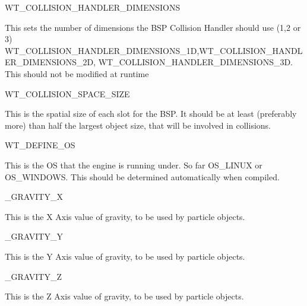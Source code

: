 \begin{DoxyItemize}
\item WT\_\-COLLISION\_\-HANDLER\_\-DIMENSIONS
\begin{DoxyItemize}
\item This sets the number of dimensions the BSP Collision Handler should use (1,2 or 3) WT\_\-COLLISION\_\-HANDLER\_\-DIMENSIONS\_\-1D,WT\_\-COLLISION\_\-HANDLER\_\-DIMENSIONS\_\-2D, WT\_\-COLLISION\_\-HANDLER\_\-DIMENSIONS\_\-3D. This should not be modified at runtime
\end{DoxyItemize}
\end{DoxyItemize}
\begin{DoxyItemize}
\item WT\_\-COLLISION\_\-SPACE\_\-SIZE
\begin{DoxyItemize}
\item This is the spatial size of each slot for the BSP. It should be at least (preferably more) than half the largest object size, that will be involved in collisions.
\end{DoxyItemize}
\end{DoxyItemize}
\begin{DoxyItemize}
\item WT\_\-DEFINE\_\-OS
\begin{DoxyItemize}
\item This is the OS that the engine is running under. So far OS\_\-LINUX or OS\_\-WINDOWS. This should be determined automatically when compiled.
\end{DoxyItemize}
\end{DoxyItemize}
\begin{DoxyItemize}
\item \_\-GRAVITY\_\-X
\begin{DoxyItemize}
\item This is the X Axis value of gravity, to be used by particle objects.
\end{DoxyItemize}
\end{DoxyItemize}
\begin{DoxyItemize}
\item \_\-GRAVITY\_\-Y
\begin{DoxyItemize}
\item This is the Y Axis value of gravity, to be used by particle objects.
\end{DoxyItemize}
\end{DoxyItemize}
\begin{DoxyItemize}
\item \_\-GRAVITY\_\-Z
\begin{DoxyItemize}
\item This is the Z Axis value of gravity, to be used by particle objects.
\end{DoxyItemize}
\end{DoxyItemize}
